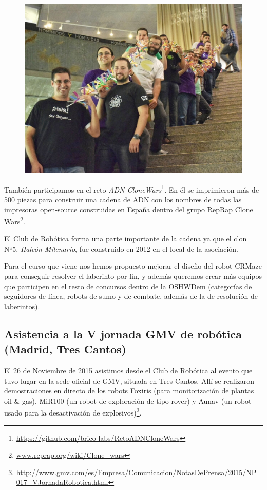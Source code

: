 \documentclass[12pt,twoside]{report}
\begin{document}
\begin{figure}\centering
    \includegraphics[scale=0.2]{fotos/2015_OSHWDem_cadenaADNcloneWars}
    \caption*{}
\end{figure}
También participamos en el reto \emph{ADN CloneWars}\footnote{\url{https://github.com/brico-labs/RetoADNCloneWars}}. En él se imprimieron más de 500 piezas para construir una cadena de ADN con los nombres de todas las impresoras open-source construidas en España dentro del grupo RepRap Clone Wars\footnote{\url{www.reprap.org/wiki/Clone_wars}}.

El Club de Robótica forma una parte importante de la cadena ya que el clon Nº5, \emph{Halcón Milenario}, fue construido en 2012 en el local de la asociación.

Para el curso que viene nos hemos propuesto mejorar el diseño del robot CRMaze para conseguir resolver el laberinto por fin, y además queremos crear más equipos que participen en el resto de concursos dentro de la OSHWDem (categorías de seguidores de línea, robots de sumo y de combate, además de la de resolución de laberintos).



\subsection{Asistencia a la V jornada GMV de robótica (Madrid, Tres Cantos)}


El 26 de Noviembre de 2015 asistimos desde el Club de Robótica al evento que tuvo lugar en la sede oficial de GMV, situada en Tres Cantos. Allí se realizaron demostraciones en directo de los robots Foxiris (para monitorización de plantas oil \& gas), MiR100 (un robot de exploración de tipo rover) y Aunav (un robot usado para la desactivación de explosivos)\footnote{\tiny\url{http://www.gmv.com/es/Empresa/Comunicacion/NotasDePrensa/2015/NP_017_VJornadaRobotica.html}}.
\end{document}
